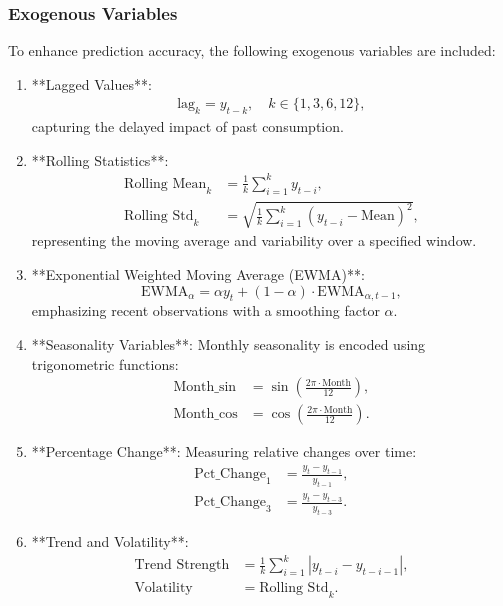 \documentclass[conference]{IEEEtran}
\begin{document}
\subsubsection{Exogenous Variables}
To enhance prediction accuracy, the following exogenous variables are included:
\begin{enumerate}
    \item **Lagged Values**:
    \begin{align}
    \text{lag}_k = y_{t-k}, \quad k \in \{1, 3, 6, 12\},
    \end{align}
    capturing the delayed impact of past consumption.

    \item **Rolling Statistics**:
    \begin{align}
    \text{Rolling Mean}_k &= \frac{1}{k} \sum_{i=1}^k y_{t-i}, \\
    \text{Rolling Std}_k &= \sqrt{\frac{1}{k} \sum_{i=1}^k (y_{t-i} - \text{Mean})^2},
    \end{align}
    representing the moving average and variability over a specified window.

    \item **Exponential Weighted Moving Average (EWMA)**:
    \begin{equation}
    \text{EWMA}_\alpha = \alpha y_t + (1 - \alpha) \cdot \text{EWMA}_{\alpha, t-1},
    \end{equation}
    emphasizing recent observations with a smoothing factor \( \alpha \).

    \item **Seasonality Variables**:
    Monthly seasonality is encoded using trigonometric functions:
    \begin{align}
    \text{Month\_sin} &= \sin\left( \frac{2 \pi \cdot \text{Month}}{12} \right), \\
    \text{Month\_cos} &= \cos\left( \frac{2 \pi \cdot \text{Month}}{12} \right).
    \end{align}

    \item **Percentage Change**:
    Measuring relative changes over time:
    \begin{align}
    \text{Pct\_Change}_1 &= \frac{y_t - y_{t-1}}{y_{t-1}}, \\
    \text{Pct\_Change}_3 &= \frac{y_t - y_{t-3}}{y_{t-3}}.
    \end{align}

    \item **Trend and Volatility**:
    \begin{align}
    \text{Trend Strength} &= \frac{1}{k} \sum_{i=1}^k |y_{t-i} - y_{t-i-1}|, \\
    \text{Volatility} &= \text{Rolling Std}_k.
    \end{align}
\end{enumerate}
\end{document}
